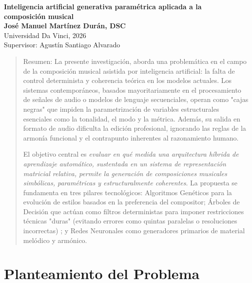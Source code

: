 \documentclass[12pt]{report}
\begin{document}
\thispagestyle{empty}
\mbox{}
\newpage

\newpage
\begin{center}
\doublespacing
\textbf{Inteligencia artificial generativa paramétrica aplicada a la \\ composición musical} \\
\vspace{1em}
\textbf{José Manuel Martínez Durán, DSC} \\
Universidad Da Vinci, 2026 \\
Supervisor: Agustín Santiago Alvarado
\end{center}
\vspace{1em}
\begin{quote}
\doublespacing
Resumen: La presente investigación, aborda una problemática en el campo de la composición musical asistida por inteligencia artificial: la falta de control determinista y coherencia teórica en los modelos actuales. Los sistemas contemporáneos, basados mayoritariamente en el procesamiento de señales de audio o modelos de lenguaje secuenciales, operan como "cajas negras" que impiden la parametrización de variables estructurales esenciales como la tonalidad, el modo y la métrica. Además, su salida en formato de audio dificulta la edición profesional, ignorando las reglas de la armonía funcional y el contrapunto inherentes al razonamiento humano.

El objetivo central es \textit{evaluar en qué medida una arquitectura híbrida de aprendizaje automático, sustentada en un sistema de representación matricial relativa, permite la generación de composiciones musicales simbólicas, paramétricas y estructuralmente coherentes}. La propuesta se fundamenta en tres pilares tecnológicos: Algoritmos Genéticos para la evolución de estilos basados en la preferencia del compositor; Árboles de Decisión que actúan como filtros deterministas para imponer restricciones técnicas "duras" (evitando errores como quintas paralelas o resoluciones incorrectas) ; y Redes Neuronales como generadores primarios de material melódico y armónico.
\end{quote}
\vspace*{\fill}
\newpage

\tableofcontents \newpage
\listoftables \newpage
\listoffigures \newpage

\doublespacing

\chapter{Planteamiento del Problema}
\end{document}
